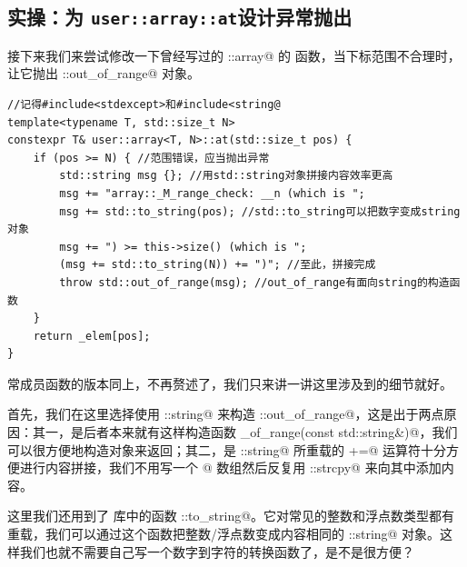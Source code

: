 \subsection*{实操：为 \texttt{user::array::at}设计异常抛出}
接下来我们来尝试修改一下曾经写过的 \lstinline@std::array@ 的 \lstinline@at@ 函数，当下标范围不合理时，让它抛出 \lstinline@std::out_of_range@ 对象。
\begin{lstlisting}
//记得#include<stdexcept>和#include<string@
template<typename T, std::size_t N>
constexpr T& user::array<T, N>::at(std::size_t pos) {
    if (pos >= N) { //范围错误，应当抛出异常
        std::string msg {}; //用std::string对象拼接内容效率更高
        msg += "array::_M_range_check: __n (which is ";
        msg += std::to_string(pos); //std::to_string可以把数字变成string对象
        msg += ") >= this->size() (which is ";
        (msg += std::to_string(N)) += ")"; //至此，拼接完成
        throw std::out_of_range(msg); //out_of_range有面向string的构造函数
    }
    return _elem[pos];
}
\end{lstlisting}
常成员函数的版本同上，不再赘述了，我们只来讲一讲这里涉及到的细节就好。\par
首先，我们在这里选择使用 \lstinline@std::string@ 来构造 \lstinline@std::out_of_range@，这是出于两点原因：其一，是后者本来就有这样构造函数 \lstinline@out_of_range(const std::string&)@，我们可以很方便地构造对象来返回；其二，是 \lstinline@std::string@ 所重载的 \lstinline@+=@ 运算符十分方便进行内容拼接，我们不用写一个 \lstinline@char[]@ 数组然后反复用 \lstinline@std::strcpy@ 来向其中添加内容。\par
这里我们还用到了 \lstinline@string@ 库中的函数 \lstinline@std::to_string@。它对常见的整数和浮点数类型都有重载，我们可以通过这个函数把整数/浮点数变成内容相同的 \lstinline@std::string@ 对象。这样我们也就不需要自己写一个数字到字符的转换函数了，是不是很方便？\par
